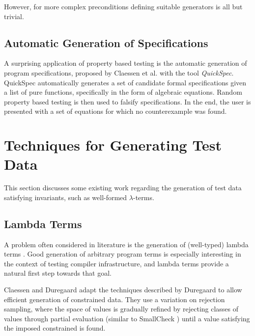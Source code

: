 \documentclass[a4paper,msc,twosized=semi]{uustthesis}
\begin{document}
  However, for more complex preconditions defining suitable generators is all but trivial. 

\subsection{Automatic Generation of Specifications}

  A surprising application of property based testing is the automatic generation of 
  program specifications, proposed by Claessen et al. \cite{claessen2010quickspec} 
  with the tool \textit{QuickSpec}. QuickSpec automatically generates a set of 
  candidate formal specifications given a list of pure functions, specifically in the 
  form of algebraic equations. Random property based testing is then used to falsify 
  specifications. In the end, the user is presented with a set of equations for which 
  no counterexample was found. 

\section{Techniques for Generating Test Data}

  This section discusses some existing work regarding the generation of test data 
  satisfying invariants, such as well-formed $\lambda$-terms. 

\subsection{Lambda Terms} 

  A problem often considered in literature is the generation of (well-typed) lambda 
  terms \cite{palka2011testing, grygiel2013counting, claessen2015generating}. Good 
  generation of arbitrary program terms is especially interesting in the context of 
  testing compiler infrastructure, and lambda terms provide a natural first step 
  towards that goal. 

  Claessen and Duregaard \cite{claessen2015generating} adapt the techniques described 
  by Duregaard \cite{duregaard2013feat} to allow efficient generation of constrained 
  data. They use a variation on rejection sampling, where the space of values is 
  gradually refined by rejecting classes of values through partial evaluation (similar 
  to SmallCheck \cite{runciman2008smallcheck}) until a value satisfying the imposed 
  constrained is found. 
\end{document}
